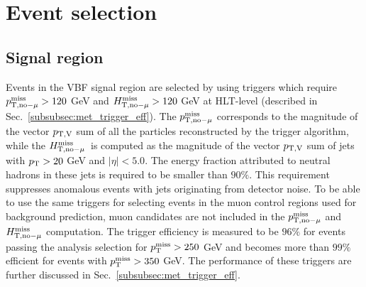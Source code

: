\section{Event selection}
\label{sec:event_selection}

\newcommand\plotDir{DataMC/merged_2023-04-08_vbfhinv_full_analysis}

\subsection{Signal region}
\label{subsec:sr_vbf_selection}

Events in the VBF signal region are selected by using triggers which require
$p_{\textrm{T},\textrm{no}-\mu}^{\textrm{miss}} > 120$ GeV and $H_{\textrm{T},\textrm{no}-\mu}^{\textrm{miss}} > 120$ GeV at HLT-level (described in Sec.~\ref{subsubsec:met_trigger_eff}). 
The $p_{\textrm{T},\textrm{no}-\mu}^{\textrm{miss}}$ corresponds to the magnitude of the vector $p_{\mathrm{T},\mathrm{V}}$ 
sum of all the particles reconstructed by the trigger algorithm, 
while the $H_{\textrm{T},\textrm{no}-\mu}^{\textrm{miss}}$~is computed as the magnitude of the vector $p_{\mathrm{T},\mathrm{V}}$ sum of jets with $p_{\textrm{T}} > 20$ GeV and $|\eta| < 5.0$. 
The energy fraction attributed to neutral hadrons in these jets is required to be smaller than $90\%$. 
This requirement suppresses anomalous events with jets originating from detector noise. 
To be able to use the same triggers for selecting events in the muon control regions used for background prediction, 
muon candidates are not included in the $p_{\textrm{T},\textrm{no}-\mu}^{\textrm{miss}}$ and $H_{\textrm{T},\textrm{no}-\mu}^{\textrm{miss}}$ computation. 
The trigger efficiency is measured to be $96\%$ for events passing the analysis selection for $p_{\textrm{T}}^{\textrm{miss}} > 250$ GeV and 
becomes more than $99\%$ efficient for events with $p_{\textrm{T}}^{\textrm{miss}} > 350$ GeV. 
The performance of these triggers are further discussed in Sec.~\ref{subsubsec:met_trigger_eff}.

